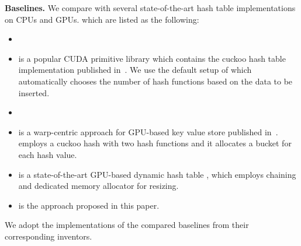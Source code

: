 \vspace{1mm}\noindent\textbf{Baselines.} We compare \voter with several state-of-the-art hash table implementations on CPUs and GPUs. which are listed as the following:
\begin{itemize}
	\item {}
	\item \cudpp is a popular CUDA primitive library which contains the cuckoo hash table implementation published in~\cite{alcantara2009real}.  
	We use the default setup of \cudpp which automatically chooses the number of hash functions based on the data to be inserted.
	\item {}
	\item \megakv is a warp-centric approach for GPU-based key value store published in~\cite{zhang2015mega}. \megakv employs a cuckoo hash with two hash functions and
	it allocates a bucket for each hash value. 
	\item \slab is a state-of-the-art GPU-based dynamic hash table \cite{ashkiani2018dynamic}, which employs chaining and dedicated memory allocator for resizing.
	\item \voter is the approach proposed in this paper. 
\end{itemize}
We adopt the implementations of the compared baselines from their corresponding inventors.

